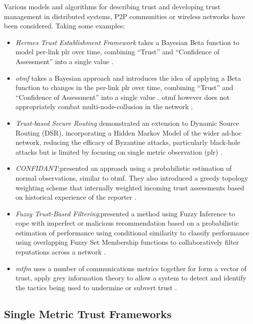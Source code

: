 Various models and algorithms for describing trust and developing trust management in distributed systems, P2P communities or wireless networks have been considered.
Taking some examples;
%
\begin{itemize}
  \item \emph{Hermes Trust Establishment Framework} takes a Bayesian Beta function to model per-link \gls{plr} over time, combining ``Trust'' and ``Confidence of Assessment'' into a single value \cite{Zouridaki2005}.
  \item \emph{\acrfull{otmf}} takes a Bayesian approach and introduces the idea of applying a Beta function to changes in the per-link \gls{plr} over time, combining ``Trust'' and ``Confidence of Assessment'' into a single value \cite{Li2008}.
    \gls{otmf} however does not appropriately combat multi-node-collusion in the network \cite{Cho2011}.
  \item \emph{Trust-based Secure Routing} demonstrated an extension to Dynamic Source Routing (DSR), incorporating a Hidden Markov Model of the wider ad-hoc network, reducing the efficacy of Byzantine attacks, particularly black-hole attacks but is limited by focusing on single metric observation (\gls{plr}) \cite{Moe2008a}\cite{Cho2011}.
  \item \emph{CONFIDANT};presented an approach using a probabilistic estimation of normal observations, similar to \gls{otmf}.
    They also introduced a greedy topology weighting scheme that internally weighted incoming trust assessments based on historical experience of the reporter \cite{Buchegger2002}.
  \item \emph{Fuzzy Trust-Based Filtering};presented a method using Fuzzy Inference to cope with imperfect or malicious recommendation based on a probabilistic estimation of performance using conditional similarity to classify performance using overlapping Fuzzy Set Membership functions to collaboratively filter reputations across a network \cite{Luo2008}.
  \item \emph{\gls{mtfm}} uses a number of communications metrics together for form a vector of trust, apply grey information theory to allow a system to detect and identify the tactics being used to undermine or subvert trust \cite{Guo11}.
\end{itemize}
%

\subsection{Single Metric Trust Frameworks}

